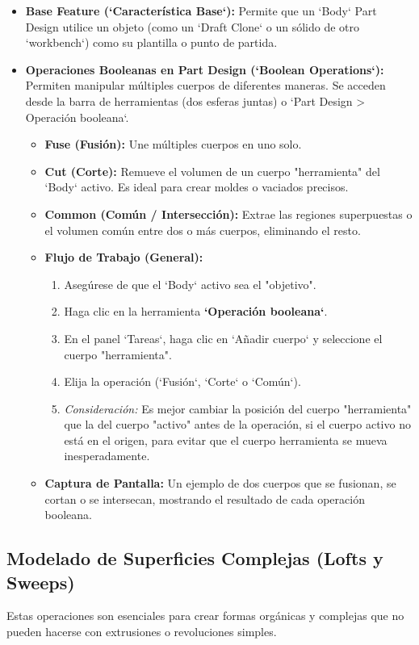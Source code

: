 \documentclass[12pt]{article}
\begin{document}
\begin{itemize}[label=\textbullet]
    \item \textbf{Base Feature (`Característica Base`):} Permite que un `Body` Part Design utilice un objeto (como un `Draft Clone` o un sólido de otro `workbench`) como su plantilla o punto de partida.
    \item \textbf{Operaciones Booleanas en Part Design (`Boolean Operations`):} Permiten manipular múltiples cuerpos de diferentes maneras. Se acceden desde la barra de herramientas (dos esferas juntas) o `Part Design > Operación booleana`.
    \begin{itemize}[label=\textendash]
        \item \textbf{Fuse (Fusión):} Une múltiples cuerpos en uno solo.
        \item \textbf{Cut (Corte):} Remueve el volumen de un cuerpo "herramienta" del `Body` activo. Es ideal para crear moldes o vaciados precisos.
        \item \textbf{Common (Común / Intersección):} Extrae las regiones superpuestas o el volumen común entre dos o más cuerpos, eliminando el resto.
        \item \textbf{Flujo de Trabajo (General):}
        \begin{enumerate}[label=\arabic*)]
            \item Asegúrese de que el `Body` activo sea el "objetivo".
            \item Haga clic en la herramienta \textbf{`Operación booleana`}.
            \item En el panel `Tareas`, haga clic en `Añadir cuerpo` y seleccione el cuerpo "herramienta".
            \item Elija la operación (`Fusión`, `Corte` o `Común`).
            \item \textit{Consideración:} Es mejor cambiar la posición del cuerpo "herramienta" que la del cuerpo "activo" antes de la operación, si el cuerpo activo no está en el origen, para evitar que el cuerpo herramienta se mueva inesperadamente.
        \end{enumerate}
        \item \textbf{Captura de Pantalla:} Un ejemplo de dos cuerpos que se fusionan, se cortan o se intersecan, mostrando el resultado de cada operación booleana.
    \end{itemize}
\end{itemize}

\subsection{Modelado de Superficies Complejas (Lofts y Sweeps)}
Estas operaciones son esenciales para crear formas orgánicas y complejas que no pueden hacerse con extrusiones o revoluciones simples.
\end{document}
